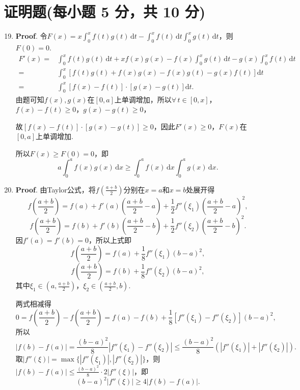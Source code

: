 \documentclass[../main.tex]{subfiles}
\begin{document}
\section{证明题(每小题 5 分，共 10 分)}
\begin{enumerate}
    \setcounter{enumi}{18}
    \item \textbf{Proof}. 令$F(x)=x\int_{0}^{x}f(t)g(t)\,\mathrm{d}t-\int_{0}^{x}
              f(t)\,\mathrm{d}t\int_{0}^{x}g(t)\,\mathrm{d}t$，则$F(0)=0$.
          \[
              \begin{aligned}
                  F'(x) = {} & \int_{0}^{x}f(t)g(t)\,\mathrm{d}t+x f(x)g(x)-f(x)\int_{0}^{x}g(t)\,\mathrm{d}t-g(x)\int_{0}^{x}f(t)\,\mathrm{d}t \\
                  = {}       & \int_{0}^{x}\left[f(t)g(t)+f(x)g(x)-f(x)g(t)-g(x)f(t)\right]\mathrm{d}t                                          \\
                  = {}       & \int_{0}^{x}\left[f(x)-f(t)\right]\cdot\left[g(x)-g(t)\right]\mathrm{d}t.
              \end{aligned}
          \]
          由题可知$f(x),g(x)$在$[0,a]$上单调增加，所以$\forall\,t\in[0,x]$，$f(x)-f(t
              )\geq0$，$g(x)-g(t)\geq0$，

          故$\left[f(x)-f(t)\right]\cdot\left[g(x)-g(t)\right]\geq0$，因此$F'(x)\geq0$，$F
              (x)$在$[0,a]$上单调增加.

          所以$F(x)\geq F(0)=0$，即
          \[
              a\int_{0}^{a}f(x)g(x)\,\mathrm{d}x\geq \int_{0}^{a}f(x)\,\mathrm{d}x\int_{0}^{a}
              g(x)\,\mathrm{d}x.
          \]

    \item \textbf{Proof}. 由Taylor公式，将$f\left(\frac{a+b}{2}\right)$分别在$x
              =a$和$x=b$处展开得
          \[
              f\left(\frac{a+b}{2}\right)=f(a)+f'(a)\left(\frac{a+b}{2}-a\right)+\frac{1}{2}f''(\xi_1)\left(\frac{a+b}{2}-a\right)^{2},
          \]
          \[
              f\left(\frac{a+b}{2}\right)=f(b)+f'(b)\left(\frac{a+b}{2}-b\right)+\frac{1}{2}f''(\xi_2)\left(\frac{a+b}{2}-b\right)^{2}.
          \]
          因$f'(a)=f'(b)=0$，所以上式即
          \[
              f\left(\frac{a+b}{2}\right)=f(a)+\frac{1}{8}f''(\xi_1)(b-a)^{2},
          \]
          \[
              f\left(\frac{a+b}{2}\right)=f(b)+\frac{1}{8}f''(\xi_2)(b-a)^{2},
          \]
          其中$\xi_{1}\in\left(a,\frac{a+b}{2}\right)$，$\xi_{2}\in\left(\frac{a+b}{2}
              ,b\right)$.

          两式相减得
          \[
              0=f\left(\frac{a+b}{2}\right)-f\left(\frac{a+b}{2}\right)=f(a)-f(b)+\frac{1}{8}
              \left[f''(\xi_{1})-f''(\xi_{2})\right](b-a)^{2},
          \]
          所以
          \[
              |f(b)-f(a)|=\frac{(b-a)^{2}}{8}\left|f''(\xi_{1})-f''(\xi_{2})\right|\leq
              \frac{(b-a)^{2}}{8}\left(|f''(\xi_{1})|+|f''(\xi_{2})|\right).
          \]
          取$|f''(\xi)|=\max\{|f''(\xi_{1})|,|f''(\xi_{2})|\}$，则$|f(b)-f(a)|\leq \frac{(b-a)^{2}}{8}\cdot 2|f''(\xi)|$，即
          \[
              (b-a)^{2}|f''(\xi)|\geq 4|f(b)-f(a)|.
          \]
\end{enumerate}
\end{document}
